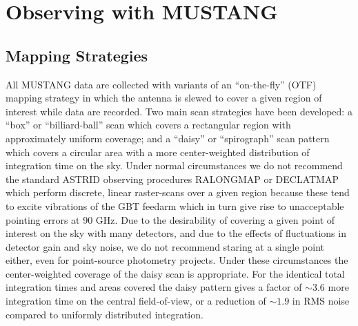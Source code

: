 
\section{Observing with MUSTANG}\label{sec:musobsstrat}



\subsection{Mapping Strategies}\label{sec:musmap}

All MUSTANG data are collected with variants of an ``on-the-fly''
(OTF) mapping strategy in which the antenna is slewed to cover a given
region of interest while data are recorded.  Two main scan strategies
have been developed: a ``box'' or ``billiard-ball'' scan which covers
a rectangular region with approximately uniform coverage; and a
``daisy'' or ``spirograph'' scan pattern which covers a circular area
with a more center-weighted distribution of integration time on the
sky. Under normal circumstances we do not recommend the standard
ASTRID observing procedures RALONGMAP or DECLATMAP which perform
discrete, linear raster-scans over a given region because these tend
to excite vibrations of the GBT feedarm which in turn give rise to
unacceptable pointing errors at 90 GHz. Due to the desirability of
covering a given point of interest on the sky with many detectors, and
due to the effects of fluctuations in detector gain and sky noise, we
do not recommend staring at a single point either, even for
point-source photometry projects. Under these circumstances the
center-weighted coverage of the daisy scan is appropriate. For the
identical total integration times and areas covered the daisy pattern
gives a factor of $\sim 3.6$ more integration time on the central
field-of-view, or a reduction of $\sim 1.9$ in RMS noise compared to
uniformly distributed integration.


